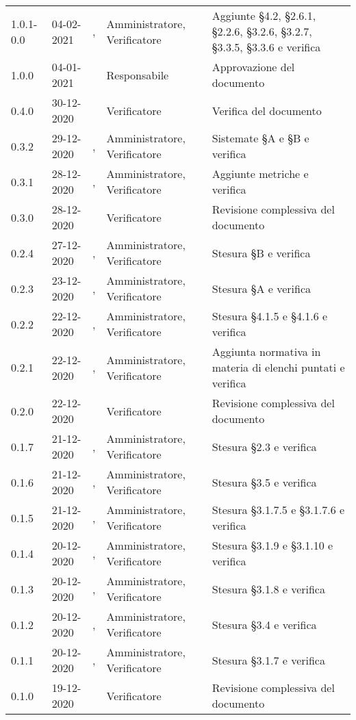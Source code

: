 {\begin{longtable}{C{1.7cm} | C{2.2cm} | C{3.2cm} | C{3cm} | C{4.8cm}}
1.0.1-0.0 & 04-02-2021 & \PA{}, \BM{} & Amministratore, Verificatore & Aggiunte \S 4.2, \S 2.6.1, \S 2.2.6, \S 3.2.6, \S 3.2.7, \S 3.3.5, \S 3.3.6 e verifica \\
1.0.0 & 04-01-2021 & \Approvatore{} & Responsabile & Approvazione del documento \\
0.4.0 & 30-12-2020 & \SG{} & Verificatore & Verifica del documento \\
0.3.2 & 29-12-2020 & \ZM{}, \SP{} & Amministratore, Verificatore & Sistemate \S A e \S B e verifica \\
0.3.1 & 28-12-2020 & \ZM{}, \SP{} & Amministratore, Verificatore & Aggiunte metriche e verifica \\
0.3.0 & 28-12-2020 & \SP{} & Verificatore & Revisione complessiva del documento\\
0.2.4 & 27-12-2020 & \PA{}, \SG{} & Amministratore, Verificatore & Stesura \S B e verifica\\
0.2.3 & 23-12-2020 & \PA{}, \BM{} & Amministratore, Verificatore & Stesura \S A e verifica\\
0.2.2 & 22-12-2020 & \SH{}, \BM{} & Amministratore, Verificatore & Stesura \S 4.1.5 e \S 4.1.6 e verifica\\
0.2.1 & 22-12-2020 & \PA{}, \SG{} & Amministratore, Verificatore & Aggiunta normativa in materia di elenchi puntati e verifica\\
0.2.0 & 22-12-2020 & \SG{} & Verificatore & Revisione complessiva del documento \\
0.1.7 & 21-12-2020 & \ZM{}, \SP{} & Amministratore, Verificatore & Stesura \S 2.3 e verifica \\
0.1.6 & 21-12-2020 & \RA{}, \BM{} & Amministratore, Verificatore & Stesura \S 3.5 e verifica \\
0.1.5 & 21-12-2020 & \PA{}, \BM{} & Amministratore, Verificatore & Stesura \S 3.1.7.5 e \S 3.1.7.6 e verifica \\
0.1.4 & 20-12-2020 & \ZM{}, \SP{} & Amministratore, Verificatore & Stesura \S 3.1.9 e \S 3.1.10 e verifica \\
0.1.3 & 20-12-2020 & \PA{}, \SP{} & Amministratore, Verificatore & Stesura \S 3.1.8 e verifica \\
0.1.2 & 20-12-2020 & \RA{}, \BM{} & Amministratore, Verificatore & Stesura \S 3.4 e verifica \\
0.1.1 & 20-12-2020 & \PA{}, \SP{}  & Amministratore, Verificatore & Stesura \S 3.1.7 e verifica \\
0.1.0 & 19-12-2020 & \SG{} & Verificatore & Revisione complessiva del documento \\

\end{longtable}}
